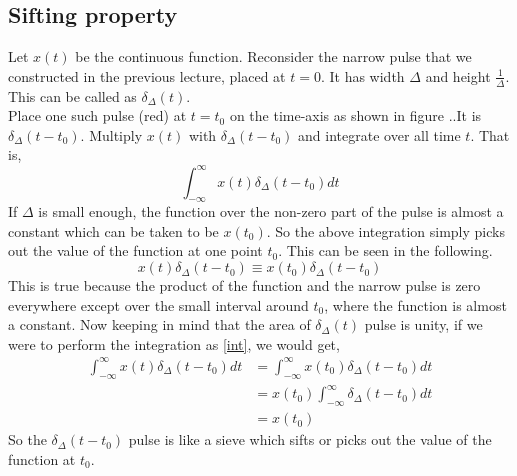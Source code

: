 \subsection{Sifting property}
Let $x(t)$ be the continuous function. Reconsider the narrow pulse that we constructed in the previous lecture, placed at $t = 0$. It has width $\Delta$ and height $\frac{1}{\Delta}$. This can be called as {\bf $\delta_{\Delta}(t)$}. %
\\

Place one such pulse (red) at $t = t_{0}$ on the time-axis as shown in figure ..It is $\delta_{\Delta}(t - t_{0})$. Multiply $x(t)$ with $\delta_{\Delta}(t - t_{0})$ and integrate over all time $t$. That is,
\begin{equation} \label{int}
\int_{-\infty}^\infty x(t) \delta_{\Delta}(t - t_{0}) dt 
\end{equation}
If $\Delta $ is small enough, the function over the non-zero part of the pulse is almost a constant which can be taken to be $x(t_{0})$. So the above integration simply picks out the value of the function at one point $t_{0}$. This can be seen in the following.
\begin{equation}
x(t) \delta_{\Delta}(t - t_{0}) \equiv x(t_{0}) \delta_{\Delta}(t - t_{0})
\end{equation} 
This is true because the product of the function and the narrow pulse is zero everywhere except over the small interval around $t_{0}$, where the function is almost a constant. Now keeping in mind that the area of $\delta_{\Delta}(t)$ pulse is unity, if we were to perform the integration as \eqref{int}, we would get,
\begin{equation}
\begin{split}
\int_{-\infty}^\infty x(t) \delta_{\Delta}(t - t_{0}) dt  & = \int_{-\infty}^\infty x(t_{0}) \delta_{\Delta}(t - t_{0}) dt \\
& = x(t_{0})  \int_{-\infty}^\infty \delta_{\Delta}(t - t_{0}) dt \\
& = x(t_{0})
\end{split}
\end{equation} 
So the $\delta_{\Delta}(t - t_{0})$ pulse is like a sieve which sifts or picks out the value of the function at $t_{0}$. 

